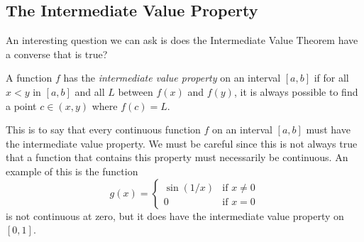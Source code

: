 \subsection{The Intermediate Value Property} 

An interesting question we can ask is does the Intermediate Value Theorem have a converse that is true?

\begin{definition}
    A function \( f  \) has the \textit{intermediate value property} on an interval \( [a,b] \) if for all \( x < y  \) in \( [a,b] \) and all \( L   \) between \( f(x)  \) and \( f(y) \), it is always possible to find a point \( c \in (x,y) \) where \( f(c) = L  \).
\end{definition}

This is to say that every continuous function \( f \) on an interval \( [a,b] \) must have the intermediate value property. We must be careful since this is not always true that a function that contains this property must necessarily be continuous. An example of this is the function 
\[  g(x) = 
\begin{cases}
    \sin(1/x) &\text{if } x \neq 0 \\
    0 &\text{if } x = 0
\end{cases}  \]
is not continuous at zero, but it does have the intermediate value property on \( [0,1] \). 



